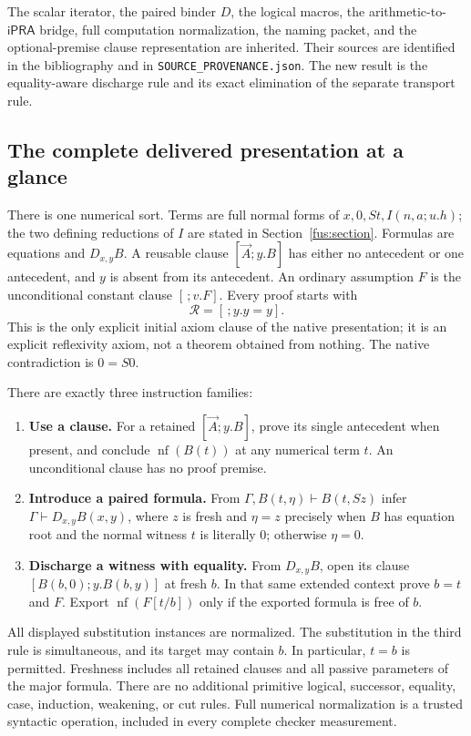 \documentclass[11pt,letterpaper]{article}
\theoremstyle{definition}\newtheorem{definition}[theorem]{Definition}
\theoremstyle{remark}\newtheorem{remark}[theorem]{Remark}
\newcommand{\nf}{\operatorname{nf}}
\newcommand{\ipra}{\mathsf{iPRA}}
\begin{document}
The scalar iterator, the paired binder $D$, the logical macros, the
arithmetic-to-$\ipra$ bridge, full computation normalization, the naming
packet, and the optional-premise clause representation are inherited.
Their sources are identified in the bibliography and in
\texttt{SOURCE\_PROVENANCE.json}. The new result is the equality-aware
discharge rule and its exact elimination of the separate transport rule.

\subsection{The complete delivered presentation at a glance}

There is one numerical sort. Terms are full normal forms of
$x,0,St,I(n,a;u.h)$; the two defining reductions of $I$ are stated in
Section~\ref{fus:section}. Formulas are equations and $D_{x,y}B$.
A reusable clause $[\vec A;y.B]$ has either no antecedent or one antecedent,
and $y$ is absent from its antecedent. An ordinary assumption $F$ is the
unconditional constant clause $[\,;v.F]$. Every proof starts with
\[
             \boxed{\mathcal R=[\,;y.y=y].}
\]
This is the only explicit initial axiom clause of the native presentation;
it is an explicit reflexivity axiom, not a theorem obtained from nothing.
The native contradiction is $0=S0$.

There are exactly three instruction families:
\begin{enumerate}
\item \textbf{Use a clause.} For a retained $[\vec A;y.B]$, prove its
single antecedent when present, and conclude $\nf(B(t))$ at any numerical
term $t$. An unconditional clause has no proof premise.
\item \textbf{Introduce a paired formula.} From
$\Gamma,B(t,\eta)\vdash B(t,Sz)$ infer $\Gamma\vdash D_{x,y}B(x,y)$,
where $z$ is fresh and $\eta=z$ precisely when $B$ has equation root and
the normal witness $t$ is literally $0$; otherwise $\eta=0$.
\item \textbf{Discharge a witness with equality.} From $D_{x,y}B$, open
its clause $[B(b,0);y.B(b,y)]$ at fresh $b$. In that same extended context
prove $b=t$ and $F$. Export $\nf(F[t/b])$ only if the exported formula is
free of $b$.
\end{enumerate}
All displayed substitution instances are normalized. The substitution in
the third rule is simultaneous, and its target may contain $b$. In particular,
$t=b$ is permitted. Freshness includes all retained clauses and all passive
parameters of the major formula. There are no additional primitive logical,
successor, equality, case, induction, weakening, or cut rules. Full numerical
normalization is a trusted syntactic operation, included in every complete
checker measurement.
\end{document}

